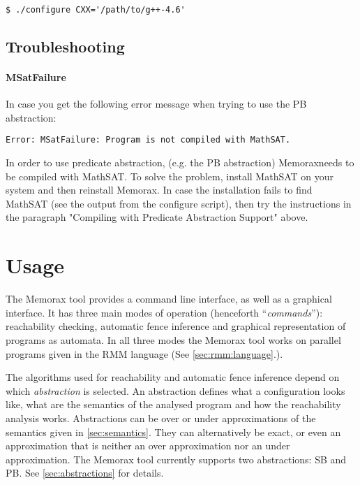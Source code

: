 \documentclass[a4paper]{article}
\newcommand{\tool}{Memorax} %
\newcommand{\thetool}{the Memorax tool} %
\newcommand{\Thetool}{The Memorax tool} %
\begin{document}
\begin{verbatim}
$ ./configure CXX='/path/to/g++-4.6'
\end{verbatim}

\subsection{Troubleshooting}

\paragraph{MSatFailure}

   In case you get the following error message when trying to use the
   PB abstraction:

\begin{verbatim}
Error: MSatFailure: Program is not compiled with MathSAT.
\end{verbatim}

   In order to use predicate abstraction, (e.g. the PB abstraction)
   \tool needs to be compiled with MathSAT. To solve the problem,
   install MathSAT on your system and then reinstall \tool. In case the
   installation fails to find MathSAT (see the output from the
   configure script), then try the instructions in the paragraph
   "Compiling with Predicate Abstraction Support" above.

\section{Usage}\label{sec:usage}

\Thetool{} provides a command line interface, as well as a graphical
interface. It has three main modes of operation (henceforth
``\emph{commands}''): reachability checking, automatic fence inference
and graphical representation of programs as automata. In all three
modes \thetool{} works on parallel programs given in the RMM language
(See \cref{sec:rmm:language}.).

The algorithms used for reachability and automatic fence inference
depend on which \emph{abstraction} is selected. An abstraction defines
what a configuration looks like, what are the semantics of the
analysed program and how the reachability analysis works. Abstractions
can be over or under approximations of the semantics given in
\cref{sec:semantics}. They can alternatively be exact, or even an
approximation that is neither an over approximation nor an under
approximation. \Thetool{} currently supports two abstractions: SB and
PB. See \cref{sec:abstractions} for details.
\end{document}
